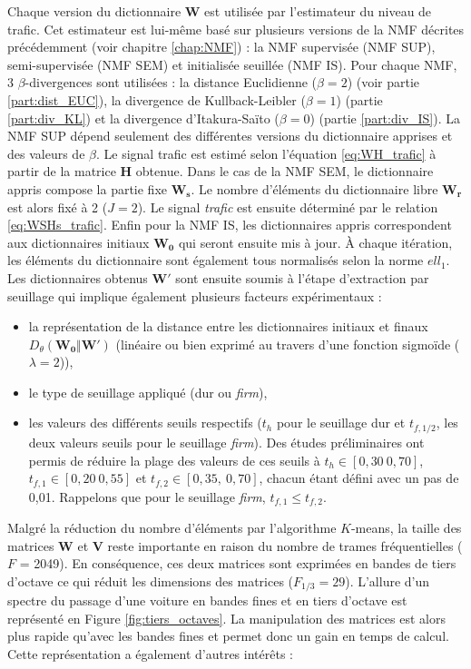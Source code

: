 Chaque version du dictionnaire $\mathbf{W}$ est utilisée par l'estimateur du niveau de trafic. Cet estimateur est lui-même basé sur plusieurs versions de la NMF décrites précédemment (voir chapitre \ref{chap:NMF})  : la NMF supervisée (NMF SUP), semi-supervisée (NMF SEM) et initialisée seuillée (NMF IS). Pour chaque NMF, 3 $\beta$-divergences sont utilisées : la distance Euclidienne ($\beta = 2$) (voir partie \ref{part:dist_EUC}), la divergence de Kullback-Leibler ($\beta = 1$) (partie \ref{part:div_KL}) et la divergence d'Itakura-Saïto ($\beta = 0$) (partie \ref{part:div_IS}). La NMF SUP dépend seulement des différentes versions du dictionnaire apprises et des valeurs de $\beta$. Le signal trafic est estimé selon l'équation \ref{eq:WH_trafic} à partir de la matrice $\mathbf{H}$ obtenue.
Dans le cas de la NMF SEM, le dictionnaire appris compose la partie fixe $\mathbf{W_s}$. Le nombre d'éléments du dictionnaire libre $\mathbf{W_r}$ est alors fixé à 2 ($J = 2$). Le signal \textit{trafic} est ensuite déterminé par le relation \ref{eq:WSHs_trafic}.
Enfin pour la NMF IS, les dictionnaires appris correspondent aux dictionnaires initiaux $\mathbf{W_0}$ qui seront ensuite mis à jour. À chaque itération, les éléments du dictionnaire sont également tous normalisés selon la norme $ell_1$. Les dictionnaires obtenus $\mathbf{W'}$ sont ensuite soumis à l'étape d'extraction par seuillage qui implique également plusieurs facteurs expérimentaux :

\begin{itemize}
\item la représentation de la distance entre les dictionnaires initiaux et finaux $D_{\theta}(\mathbf{W_0} \Vert \mathbf{W'})$ (linéaire ou bien exprimé au travers d'une fonction sigmoïde ($\lambda = 2$)),
\item le type de seuillage appliqué (dur ou \textit{firm}),
\item les valeurs des différents seuils respectifs ($t_h$ pour le seuillage dur et $t_{f,1/2}$, les deux valeurs seuils pour le seuillage \textit{firm}). Des études préliminaires ont permis de réduire la plage des valeurs de ces seuils à $t_h \in \left[ 0,30~0,70 \right]$, $t_{f,1} \in \left[ 0,20~0,55 \right]$ et $t_{f,2} \in \left[ 0,35,~0,70 \right]$, chacun étant défini avec un pas de 0,01. Rappelons que pour le seuillage \textit{firm}, $t_{f,1} \leq t_{f,2}$.
\end{itemize}

Malgré la réduction du nombre d'éléments par l'algorithme $K$-means, la taille des matrices $\mathbf{W}$ et $\mathbf{V}$ reste importante en raison du nombre de trames fréquentielles ($F$ = 2049). En conséquence, ces deux matrices sont exprimées en bandes de tiers d'octave ce qui réduit les dimensions des matrices ($F_{1/3} = 29$). L'allure d'un spectre du passage d'une voiture en bandes fines et en tiers d'octave est représenté en Figure \ref{fig:tiers_octaves}. La manipulation des matrices est alors plus rapide qu'avec les bandes fines et permet donc un gain en temps de calcul. Cette représentation a également d'autres intérêts :

